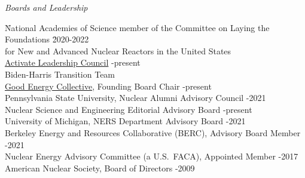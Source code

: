 \vspace*{-.25em}
\textit{Boards and Leadership}
\vspace*{-.4em}
\begin{tabbing}
\hspace*{1 em}\= National Academies of Science member of the Committee on Laying the
Foundations \hspace*{0.5em} \= 2020-2022\\
\> \hspace*{1em} for New and Advanced Nuclear Reactors in the United States\\
%
\> \href{https://www.activate.org/leadership-council}{Activate Leadership Council} -present\\
\> Biden-Harris Transition Team \\
%
\> \href{https://www.goodenergycollective.org/}{Good Energy Collective}, Founding Board Chair -present\\
%
\> Pennsylvania State University, Nuclear Alumni Advisory Council -2021\\
%
\> Nuclear Science and Engineering Editorial Advisory Board -present\\
%
\> University of Michigan, NERS Department Advisory Board -2021\\
%
\> Berkeley Energy and Resources Collaborative (BERC), Advisory Board Member -2021\\
%
%
\> Nuclear Energy Advisory Committee (a U.S.\ FACA), Appointed Member -2017 \\
%
%
%
\> American  Nuclear Society, Board of Directors -2009
\end{tabbing}

